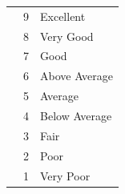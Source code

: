 \documentclass[11pt]{scrartcl} %
\begin{document}
\begin{center}
\begin{tabular}{c c c c c c}
\multicolumn{2}{|c}{} & \multicolumn{1}{c}{9} & \multicolumn{3}{l|}{Excellent}\\
\multicolumn{2}{|c}{} & \multicolumn{1}{c}{8} & \multicolumn{3}{l|}{Very Good}\\
\multicolumn{2}{|c}{} & \multicolumn{1}{c}{7} & \multicolumn{3}{l|}{Good}\\
\multicolumn{2}{|c}{} & \multicolumn{1}{c}{6} & \multicolumn{3}{l|}{Above Average}\\
\multicolumn{2}{|c}{} & \multicolumn{1}{c}{5} & \multicolumn{3}{l|}{Average}\\
\multicolumn{2}{|c}{} & \multicolumn{1}{c}{4} & \multicolumn{3}{l|}{Below Average}\\
\multicolumn{2}{|c}{} & \multicolumn{1}{c}{3} & \multicolumn{3}{l|}{Fair}\\
\multicolumn{2}{|c}{} & \multicolumn{1}{c}{2} & \multicolumn{3}{l|}{Poor}\\
\multicolumn{2}{|c}{} & \multicolumn{1}{c}{1} & \multicolumn{3}{l|}{Very Poor}\\
\hline
\end{tabular}
\end{center}
\end{document}
